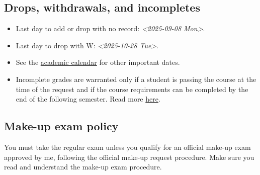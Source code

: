 \documentclass[11pt]{article}
\begin{document}
\subsection{Drops, withdrawals, and incompletes}
\label{sec:org796e2ad}
\begin{itemize}
\item Last day to add or drop with no record: \textit{<2025-09-08 Mon>}.
\item Last day to drop with W: \textit{<2025-10-28 Tue>}.
\item See the \href{https://www.umass.edu/registrar/academic-calendar}{academic calendar} for other important dates.
\item Incomplete grades are warranted only if a student is passing the course at the
time of the request and if the course requirements can be completed by the
end of the following semester. Read more \href{https://www.umass.edu/natural-sciences/advising/petitions-and-forms/incomplete-grade-form}{here}.
\end{itemize}

\subsection{Make-up exam policy}
\label{sec:org42f44c0}
You must take the regular exam unless you qualify for an official make-up exam
approved by me, following the official make-up request procedure. Make sure you
read and understand the make-up exam procedure.
\end{document}
